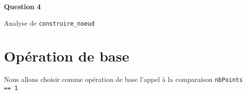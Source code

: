 \documentclass[class=article]{standalone}
\begin{document}
 
\centerline{\Huge \bf Question 4}

\centerline{Analyse de \lstinline{construire_noeud}}

\section*{Opération de base}

Nous allons choisir comme opération de base l'appel à la comparaison \lstinline{nbPoints == 1}
\end{document}
